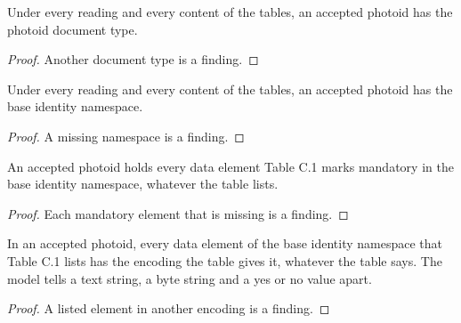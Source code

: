 \begin{theorem}
  \label{thm:photoid-doctype}
  Under every reading and every content of the tables, an accepted photoid
  has the photoid document type.
\end{theorem}
\begin{proof}
  Another document type is a finding.
\end{proof}

\begin{theorem}
  \label{thm:photoid-has-base}
  Under every reading and every content of the tables, an accepted photoid
  has the base identity namespace.
\end{theorem}
\begin{proof}
  A missing namespace is a finding.
\end{proof}

\begin{theorem}
  \label{thm:photoid-mandatory-base}
  An accepted photoid holds every data element Table C.1 marks mandatory in
  the base identity namespace, whatever the table lists.
\end{theorem}
\begin{proof}
  Each mandatory element that is missing is a finding.
\end{proof}

\begin{theorem}
  \label{thm:photoid-base-encoding}
  In an accepted photoid, every data element of the base identity namespace
  that Table C.1 lists has the encoding the table gives it, whatever the
  table says.  The model tells a text string, a byte string and a yes or no
  value apart.
\end{theorem}
\begin{proof}
  A listed element in another encoding is a finding.
\end{proof}

